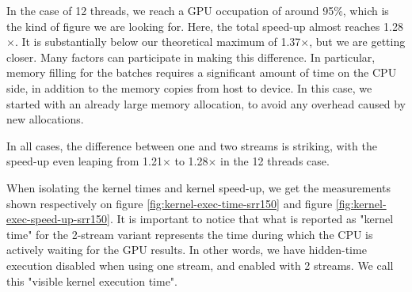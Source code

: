 In the case of 12 threads, we reach a GPU occupation of around 95\%, which is the kind of figure we are looking for. Here, the total speed-up almost reaches 1.28$\times$. It is substantially below our theoretical maximum of 1.37$\times$, but we are getting closer. Many factors can participate in making this difference. In particular, memory filling for the batches requires a significant amount of time on the CPU side, in addition to the memory copies from host to device. In this case, we started with an already large memory allocation, to avoid any overhead caused by new allocations.

In all cases, the difference between one and two streams is striking, with the speed-up even leaping from 1.21$\times$ to 1.28$\times$ in the 12 threads case.

When isolating the kernel times and kernel speed-up, we get the measurements shown respectively on figure \ref{fig:kernel-exec-time-srr150} and figure \ref{fig:kernel-exec-speed-up-srr150}. It is important to notice that what is reported as "kernel time" for the 2-stream variant represents the time during which the CPU is actively waiting for the GPU results. In other words, we have hidden-time execution disabled when using one stream, and enabled with 2 streams. We call this "visible kernel execution time".


